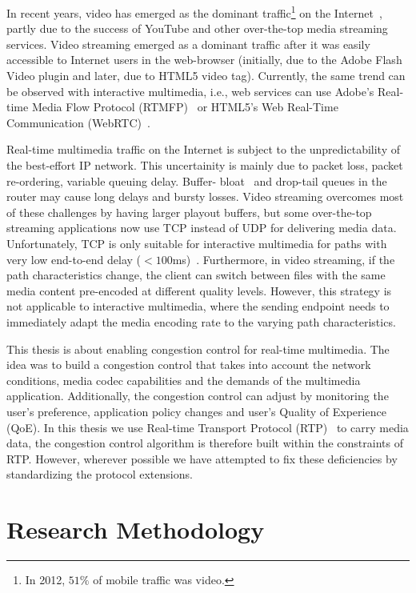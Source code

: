 In recent years, video has emerged as the dominant traffic\footnote{In 2012,
$51\%$ of mobile traffic was video.} on the Internet~\cite{cvni.13,dawn.zb},
partly due to the success of YouTube and other over-the-top media streaming
services. Video streaming emerged as a dominant traffic after it was easily
accessible to Internet users in the web-browser (initially, due to the Adobe
Flash Video plugin and later, due to HTML5 video tag). Currently, the same
trend can be observed with interactive multimedia, i.e., web services can use
Adobe's Real-time Media Flow Protocol (RTMFP)~\cite{draft.rtmfp} or HTML5's
Web Real-Time Communication (WebRTC)~\cite{draft.webrtc}.

Real-time multimedia traffic on the Internet is subject to the
unpredictability of the best-effort IP network. This uncertainity is mainly
due to packet loss, packet re-ordering, variable queuing delay. Buffer-
bloat~\cite{gettys:bufferbloat} and drop-tail queues in the router may cause
long delays and bursty losses. Video streaming overcomes most of these
challenges by having larger playout buffers, but some over-the-top streaming
applications now use TCP instead of UDP for delivering media data.
Unfortunately, TCP is only suitable for interactive multimedia for paths with
very low end-to-end delay ($<100$ms)~\cite{Brosh:tcp-real-time}. Furthermore,
in video streaming, if the path characteristics change, the client can switch
between files with the same media content pre-encoded at different quality
levels. However, this strategy is not applicable to interactive multimedia,
where the sending endpoint needs to immediately adapt the media encoding rate
to the varying path characteristics.

This thesis is about enabling congestion control for real-time multimedia. The
idea was to build a congestion control that takes into account the network
conditions, media codec capabilities and the demands of the multimedia
application. Additionally, the congestion control can adjust by monitoring the
user's preference, application policy changes and user's Quality of Experience
(QoE). In this thesis we use Real-time Transport Protocol (RTP)~\cite{rfc3550}
to carry media data, the congestion control algorithm is therefore built
within the constraints of RTP. However, wherever possible we have attempted to
fix these deficiencies by standardizing the protocol extensions.


\section{Research Methodology}

